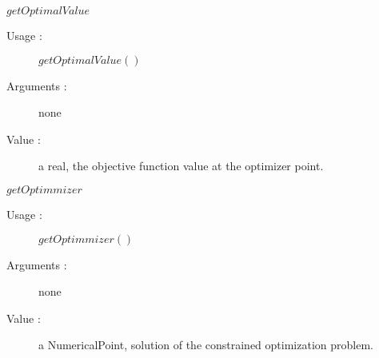 \begin{description}
\begin{description}
  \item $getOptimalValue$
    \begin{description}
    \item[Usage :] $getOptimalValue()$
    \item[Arguments :] none
    \item[Value :] a real, the objective function value at the optimizer point.
    \end{description}
    \bigskip

  \item $getOptimmizer$
    \begin{description}
    \item[Usage :] $getOptimmizer()$
    \item[Arguments :] none
    \item[Value :] a NumericalPoint, solution of the constrained optimization problem.
    \end{description}


  \end{description}

\end{description}
